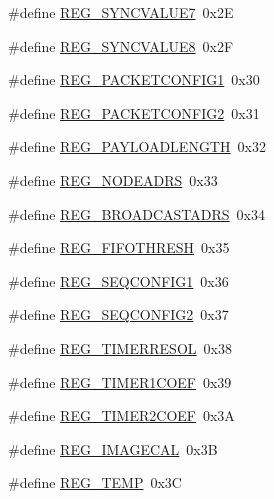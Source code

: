 \begin{DoxyCompactItemize}
\item 
\#define \mbox{\hyperlink{sx1276_regs-_fsk_8h_ac276ab640ba22f4edb9cc206567f1e22}{R\+E\+G\+\_\+\+S\+Y\+N\+C\+V\+A\+L\+U\+E7}}~0x2E
\item 
\#define \mbox{\hyperlink{sx1276_regs-_fsk_8h_ab29ed95bcf10e2b561a2400806344f81}{R\+E\+G\+\_\+\+S\+Y\+N\+C\+V\+A\+L\+U\+E8}}~0x2F
\item 
\#define \mbox{\hyperlink{sx1276_regs-_fsk_8h_a035c91c3eea7209c78ac5bda775940cc}{R\+E\+G\+\_\+\+P\+A\+C\+K\+E\+T\+C\+O\+N\+F\+I\+G1}}~0x30
\item 
\#define \mbox{\hyperlink{sx1276_regs-_fsk_8h_a519d7b5db6ab8bb6013226eaef9756c8}{R\+E\+G\+\_\+\+P\+A\+C\+K\+E\+T\+C\+O\+N\+F\+I\+G2}}~0x31
\item 
\#define \mbox{\hyperlink{sx1276_regs-_fsk_8h_ac1f66aa74c41653c8d30ce6b92af3769}{R\+E\+G\+\_\+\+P\+A\+Y\+L\+O\+A\+D\+L\+E\+N\+G\+TH}}~0x32
\item 
\#define \mbox{\hyperlink{sx1276_regs-_fsk_8h_aa62099ad5a5d4b5967f1ded180d5f685}{R\+E\+G\+\_\+\+N\+O\+D\+E\+A\+D\+RS}}~0x33
\item 
\#define \mbox{\hyperlink{sx1276_regs-_fsk_8h_a5c96b6f1a3e95a80f700d3a0c8ed5742}{R\+E\+G\+\_\+\+B\+R\+O\+A\+D\+C\+A\+S\+T\+A\+D\+RS}}~0x34
\item 
\#define \mbox{\hyperlink{sx1276_regs-_fsk_8h_a18b41b1ddfbe6eb514f74431b5d76792}{R\+E\+G\+\_\+\+F\+I\+F\+O\+T\+H\+R\+E\+SH}}~0x35
\item 
\#define \mbox{\hyperlink{sx1276_regs-_fsk_8h_aed3f5e12a0c953d12aacbc1146f2dde8}{R\+E\+G\+\_\+\+S\+E\+Q\+C\+O\+N\+F\+I\+G1}}~0x36
\item 
\#define \mbox{\hyperlink{sx1276_regs-_fsk_8h_a93a8f2fecd93790802eab65f9685dfb6}{R\+E\+G\+\_\+\+S\+E\+Q\+C\+O\+N\+F\+I\+G2}}~0x37
\item 
\#define \mbox{\hyperlink{sx1276_regs-_fsk_8h_a92529ed06adfae1625c5300057a88f23}{R\+E\+G\+\_\+\+T\+I\+M\+E\+R\+R\+E\+S\+OL}}~0x38
\item 
\#define \mbox{\hyperlink{sx1276_regs-_fsk_8h_a748e83f19ce0c442f47ff56c3ae2ae1c}{R\+E\+G\+\_\+\+T\+I\+M\+E\+R1\+C\+O\+EF}}~0x39
\item 
\#define \mbox{\hyperlink{sx1276_regs-_fsk_8h_a35594318e2541ff55e79e1ce8d52ab8a}{R\+E\+G\+\_\+\+T\+I\+M\+E\+R2\+C\+O\+EF}}~0x3A
\item 
\#define \mbox{\hyperlink{sx1276_regs-_fsk_8h_aeb557bae3e3e5ffb390a6f6a61ac686d}{R\+E\+G\+\_\+\+I\+M\+A\+G\+E\+C\+AL}}~0x3B
\item 
\#define \mbox{\hyperlink{sx1276_regs-_fsk_8h_ad3b0b6d8d5d3de58e5d56ce84e667b20}{R\+E\+G\+\_\+\+T\+E\+MP}}~0x3C

\end{DoxyCompactItemize}
